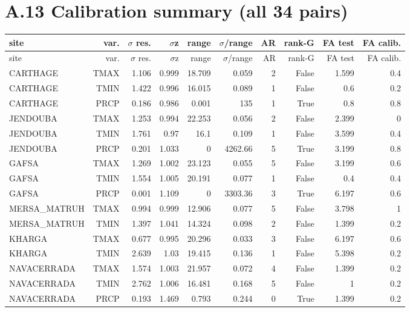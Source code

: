 \documentclass[10pt,a4paper]{article}
\begin{document}
\section*{A.13 Calibration summary (all 34 pairs)}
{\small
\setlength{\tabcolsep}{3pt}
\setlength{\LTleft}{\fill}
\setlength{\LTright}{\fill}
\begin{longtable}{lrrrrrrrrr}
\toprule
site & var. & $\sigma$ res. & $\sigma$z & range & $\sigma$/\allowbreak{}range & AR & rank-\allowbreak{}G & FA test & FA calib. \\
\midrule
\endfirsthead
\toprule
site & var. & $\sigma$ res. & $\sigma$z & range & $\sigma$/\allowbreak{}range & AR & rank-\allowbreak{}G & FA test & FA calib. \\
\midrule
\endhead
\bottomrule
\endlastfoot
CARTHAGE & TMAX & 1.106 & 0.999 & 18.709 & 0.059 & 2 & False & 1.599 & 0.4 \\
CARTHAGE & TMIN & 1.422 & 0.996 & 16.015 & 0.089 & 1 & False & 0.6 & 0.2 \\
CARTHAGE & PRCP & 0.186 & 0.986 & 0.001 & 135 & 1 & True & 0.8 & 0.8 \\
JENDOUBA & TMAX & 1.253 & 0.994 & 22.253 & 0.056 & 2 & False & 2.399 & 0 \\
JENDOUBA & TMIN & 1.761 & 0.97 & 16.1 & 0.109 & 1 & False & 3.599 & 0.4 \\
JENDOUBA & PRCP & 0.201 & 1.033 & 0 & 4262.66 & 5 & True & 3.199 & 0.8 \\
GAFSA & TMAX & 1.269 & 1.002 & 23.123 & 0.055 & 5 & False & 3.199 & 0.6 \\
GAFSA & TMIN & 1.554 & 1.005 & 20.191 & 0.077 & 1 & False & 0.4 & 0.4 \\
GAFSA & PRCP & 0.001 & 1.109 & 0 & 3303.36 & 3 & True & 6.197 & 0.6 \\
MERSA\_\allowbreak{}MATRUH & TMAX & 0.994 & 0.999 & 12.906 & 0.077 & 5 & False & 3.798 & 1 \\
MERSA\_\allowbreak{}MATRUH & TMIN & 1.397 & 1.041 & 14.324 & 0.098 & 2 & False & 1.399 & 0.2 \\
KHARGA & TMAX & 0.677 & 0.995 & 20.296 & 0.033 & 3 & False & 6.197 & 0.6 \\
KHARGA & TMIN & 2.639 & 1.03 & 19.415 & 0.136 & 1 & False & 5.398 & 0.2 \\
NAVACERRADA & TMAX & 1.574 & 1.003 & 21.957 & 0.072 & 4 & False & 1.399 & 0.2 \\
NAVACERRADA & TMIN & 2.762 & 1.006 & 16.481 & 0.168 & 5 & False & 1 & 0.2 \\
NAVACERRADA & PRCP & 0.193 & 1.469 & 0.793 & 0.244 & 0 & True & 1.399 & 0.2 \\

\end{longtable}}
\end{document}
